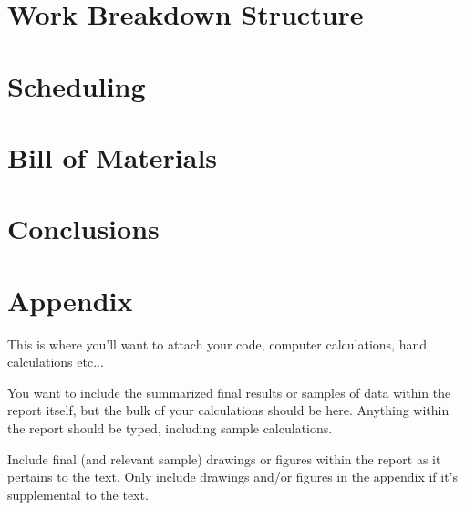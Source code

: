 \documentclass[fleqn,12pt]{project}
\begin{document}
\newpage
\section{Work Breakdown Structure}

\section{Scheduling}

\section{Bill of Materials}

\section{Conclusions}


\newpage
{}
\newpage
\section*{Appendix}

This is where you'll want to attach your code, computer calculations, hand calculations etc...

You want to include the summarized final results or samples of data within the report itself, but the bulk of your calculations should be here. Anything within the report should be typed, including sample calculations.

Include final (and relevant sample) drawings or figures within the report as it pertains to the text. Only include drawings and/or figures in the appendix if it's supplemental to the text. 
\end{document}
